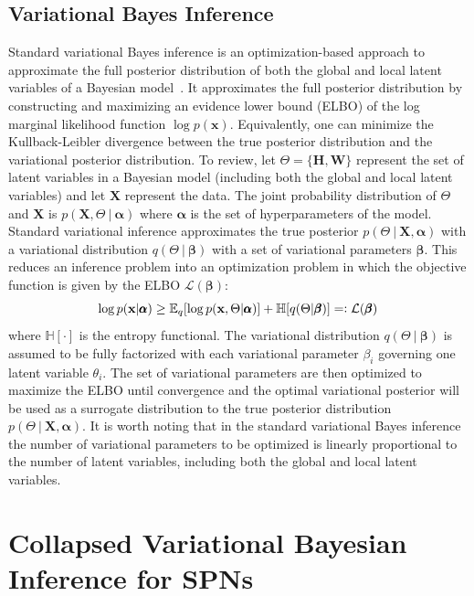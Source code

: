 \documentclass{article} %
\theoremstyle{definition}
\begin{document}
\subsection{Variational Bayes Inference}
Standard variational Bayes inference is an optimization-based approach to approximate the full posterior distribution of both the global and local latent variables of a Bayesian model~\cite{jordan1999introduction}. It approximates the full posterior distribution by constructing and maximizing an evidence lower bound (ELBO) of the log marginal likelihood function $\log p(\mathbf{x})$. Equivalently, one can minimize the Kullback-Leibler divergence between the true posterior distribution and the variational posterior distribution. To review, let $\Theta = \{\mathbf{H}, \mathbf{W}\}$ represent the set of latent variables in a Bayesian model (including both the global and local latent variables) and let $\mathbf{X}$ represent the data. The joint probability distribution of $\Theta$ and $\mathbf{X}$ is $p(\mathbf{X}, \Theta~|~\pmb\alpha)$ where $\pmb\alpha$ is the set of hyperparameters of the model. Standard variational inference approximates the true posterior $p(\Theta~|~\mathbf{X}, \pmb\alpha)$ with a variational  distribution $q(\Theta~|~\pmb\beta)$ with a set of variational parameters $\pmb\beta$. This reduces an inference problem into an optimization problem in which the objective function is given by the ELBO $\mathcal{L}(\pmb\beta)$:
\begin{equation*}
\log p(\mathbf{x}|\pmb\alpha) \geq \mathbb{E}_{q}[\log p(\mathbf{x}, \Theta|\pmb\alpha)] + \mathbb{H}[q(\Theta|\pmb\beta)] =\vcentcolon \mathcal{L}(\pmb\beta)
\end{equation*}
where $\mathbb{H}[\cdot]$ is the entropy functional. The variational distribution $q(\Theta~|~\pmb\beta)$ is assumed to be fully factorized with each variational parameter $\beta_i$ governing one latent variable $\theta_i$. The set of variational parameters are then optimized to maximize the ELBO until convergence and the optimal variational posterior will be used as a surrogate distribution to the true posterior distribution $p(\Theta~|~\mathbf{X}, \pmb\alpha)$. It is worth noting that in the standard variational Bayes inference the number of variational parameters to be optimized is linearly proportional to the number of latent variables, including both the global and local latent variables.

\section{Collapsed Variational Bayesian Inference for SPNs}
\end{document}
